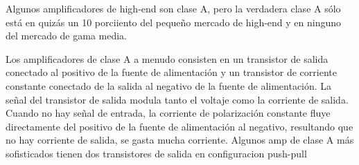 \documentclass[11pt]{article}
\begin{document}
Algunos amplificadores de high-end son clase A, pero la verdadera clase A sólo está en quizás un 10 porciiento del pequeño mercado de high-end y en ninguno del mercado de gama media.

Los amplificadores de clase A a menudo consisten en un transistor de salida conectado al positivo de la fuente de alimentación y un transistor de corriente constante conectado de la salida  al negativo de la fuente de alimentación.
La señal del transistor de salida modula tanto el voltaje como la corriente de salida. Cuando no  hay señal de entrada, la corriente de polarización constante fluye directamente del positivo de la fuente de alimentación al negativo, resultando que no hay corriente de salida, se gasta mucha corriente. Algunos amp de clase A más sofisticados tienen dos transistores de salida en configuracion push-pull
\end{document}
